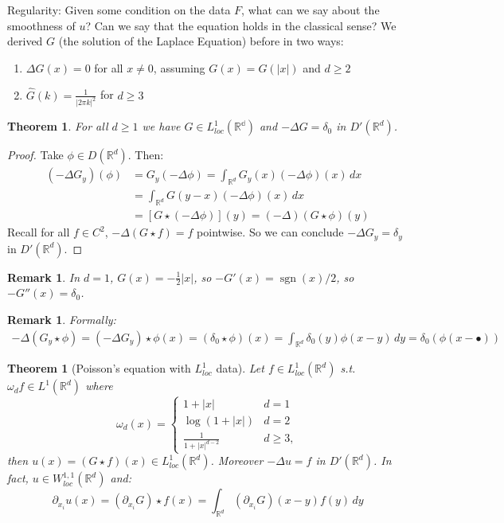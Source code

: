 \documentclass{report}
\theoremstyle{tommy}
\newtheorem{thm}[defn]{Theorem}
\newtheorem{rem}[defn]{Remark}
\newcommand{\sgn}{\operatorname{sgn}}
\begin{document}
  Regularity: Given some condition on the data \(F\), what can we say about the smoothness of \(u\)? Can we say that the equation holds in the classical sense? We derived \(G\) (the solution of the Laplace Equation) before in two ways:
  \begin{enumerate}
    \item \(\Delta G(x) = 0\) for all \(x \ne 0\), assuming \(G(x) = G(|x|)\) and \(d \ge 2\)
    \item \(\hat G(k) = \frac{1}{|2\pi k|^2}\) for \(d \ge 3\)
  \end{enumerate}
  
  \begin{thm}
    For all \(d \ge 1\) we have \(G \in L_{loc}^1(\mathbb{R^d})\) and \(- \Delta G = \delta_0\) in \(D'(\mathbb{R}^d)\).
  \end{thm}

  \begin{proof}
    Take \(\phi \in D(\mathbb{R}^d)\). Then:
    \begin{align*}
      (- \Delta G_y)(\phi) 
      &= G_y(-\Delta \phi)
      = \int_{\mathbb{R}^d} G_y(x) (-\Delta \phi)(x) \, dx \\
      &= \int_{\mathbb{R}^d} G(y-x) (-\Delta \phi)(x) \, dx \\
      &= [G \star (-\Delta \phi)](y) = (-\Delta)(G \star \phi)(y)
    \end{align*}
    Recall for all \(f \in C^2\), \(-\Delta (G \star f) = f\) pointwise. So we can conclude \(-\Delta G_y = \delta_y\) in \(D'(\mathbb{R}^d)\).
  \end{proof}
  
  \begin{rem}
    In \(d = 1\), \(G(x) = - \frac{1}{2}|x|\), so \(-G'(x) = \sgn(x)/2\), so \(-G''(x) = \delta_0\).
  \end{rem}

  \begin{rem}
    Formally: 
    \begin{align*}
      -\Delta(G_y \star \phi) = (-\Delta G_y) \star \phi(x) = (\delta_0 \star \phi)(x) = \int_{\mathbb{R}^d} \delta_0(y) \phi(x - y) \, dy = \delta_0 (\phi(x-\bullet))
    \end{align*}
  \end{rem}

  \begin{thm}[Poisson's equation with \(L_{loc}^1\) data]\label{PoissonsequationwithL1locdata}
    Let \(f \in L_{loc}^1(\mathbb{R}^d)\) s.t. \(\omega_d f \in L^1(\mathbb{R}^d)\) where 
    \[\omega_d(x) = \begin{cases}
      1 + |x| & d = 1 \\ \log(1 + |x|) & d=2 \\ \frac{1}{1 + |x|^{d-2}} & d \ge 3,
    \end{cases}\]
    then \(u(x) = (G\star f)(x) \in L_{loc}^1(\mathbb{R}^d)\). Moreover \(-\Delta u = f\) in \(D'(\mathbb{R}^d)\). In fact, \(u \in W_{loc}^{1,1}(\mathbb{R}^d)\) and:
    \[\partial_{x_i} u(x) = (\partial_{x_i} G) \star f(x) = \int_{\mathbb{R}^d} (\partial_{x_i} G)(x-y)f(y) \, dy\]
  \end{thm}
\end{document}
